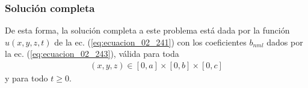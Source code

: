 \begin{frame}
\frametitle{Solución completa}
De esta forma, la solución completa a este problema está dada por la función $u(x, y, z, t)$ de la ec. (\ref{eq:ecuacion_02_241}) con los coeficientes $b_{nml}$ dados por la ec. (\ref{eq:ecuacion_02_243}), válida para toda 
\begin{align}
(x,y,z) \in [0,a] \times [0,b] \times [0,c]
\end{align} 
y para todo $t \geq 0$.
\end{frame}
